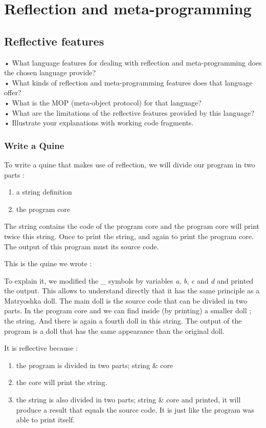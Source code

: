 \section{Reflection and meta-programming}
\subsection{Reflective features}
•	What language features for dealing with reflection and meta-programming does the chosen language provide?\\
•	What kinds of reflection and meta-programming features does that language offer?\\
•	What is the MOP (meta-object protocol) for that language?\\
•	What are the limitations of the reflective features provided by this language?\\
•	Illustrate your explanations with working code fragments.\\

\subsubsection{Write a Quine}
To write a quine that makes use of reflection, we will divide our program in two parts :
\begin{enumerate}
    \item a string definition
    \item the program core
\end{enumerate}
The string contains the code of the program core and the program core will print twice this string. Once to print the string, and again to print the program core. The output of this program must its source code.


This is the quine we wrote :


To explain it, we modified the \emph{\_} symbols by variables \emph{a}, \emph{b}, \emph{c} and \emph{d} and printed the output. This allows to understand directly that it has the same principle as a Matryoshka doll. The main doll is the source code that can be divided in two parts. In the program core and we can find inside (by printing) a smaller doll ; the string. And there is again a fourth doll in this string. The output of the program is a doll that has the same appearance than the original doll.


It is reflective because :
\begin{enumerate}
    \item the program is divided in two parts; string \& core
    \item the core will print the string.
    \item the string is also divided in two parts; string \& core and printed, it will produce a result that equals the source code. It is just like the program was able to print itself. 
\end{enumerate}

